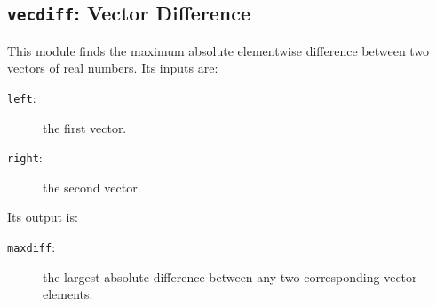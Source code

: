 \subsection{{\tt{vecdiff}}:
	Vector Difference
	\label{s:toys-vecdiff}}

This module finds the maximum absolute elementwise difference between two vectors of real numbers.
Its inputs are:
\begin{description}
\item[{\tt{left}}:]
	the first vector.
\item[{\tt{right}}:]
	the second vector.
\end{description}
Its output is:
\begin{description}
\item[{\tt{maxdiff}}:]
	the largest absolute difference between any two corresponding vector elements.
\end{description}
